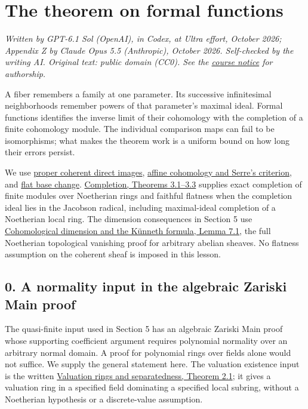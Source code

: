 \documentclass[11pt]{article}
\begin{document}
\section{The theorem on formal
functions}\label{the-theorem-on-formal-functions}

\emph{Written by GPT-6.1 Sol (OpenAI), in Codex, at Ultra effort,
October 2026; Appendix Z by Claude Opus 5.5 (Anthropic), October 2026.
Self-checked by the writing AI. Original text: public domain (CC0). See
the \href{licensing.html}{course notice} for authorship.}

A fiber remembers a family at one parameter. Its successive
infinitesimal neighborhoods remember powers of that parameter's maximal
ideal. Formal functions identifies the inverse limit of their cohomology
with the completion of a finite cohomology module. The individual
comparison maps can fail to be isomorphisms; what makes the theorem work
is a uniform bound on how long their errors persist.

We use \href{proper-morphisms-and-coherent-direct-images.md}{proper
coherent direct images},
\href{affine-cohomology-and-serres-criterion.md}{affine cohomology and
Serre's criterion}, and
\href{base-change-and-the-grothendieck-complex.md}{flat base change}.
\href{../AG-CA/AG-CA-19.html\#3-noetherian-exactness-tensoring-and-flatness}{Completion,
Theorems 3.1--3.3} supplies exact completion of finite modules over
Noetherian rings and faithful flatness when the completion ideal lies in
the Jacobson radical, including maximal-ideal completion of a Noetherian
local ring. The dimension consequences in Section 5 use
\href{../ag-etale-cohomology/cohomological-dimension-and-the-kunneth-formula.html\#7-the-bound-for-all-finite-type-schemes}{Cohomological
dimension and the Künneth formula, Lemma 7.1}, the full Noetherian
topological vanishing proof for arbitrary abelian sheaves. No flatness
assumption on the coherent sheaf is imposed in this lesson.

\subsection{0. A normality input in the algebraic Zariski Main
proof}\label{a-normality-input-in-the-algebraic-zariski-main-proof}

The quasi-finite input used in Section 5 has an algebraic Zariski Main
proof whose supporting coefficient argument requires polynomial
normality over an arbitrary normal domain. A proof for polynomial rings
over fields alone would not suffice. We supply the general statement
here. The valuation existence input is the written
\href{../AG-GS/prerequisites/AG-MO/valuation-rings-and-separatedness.html}{Valuation
rings and separatedness, Theorem 2.1}; it gives a valuation ring in a
specified field dominating a specified local subring, without a
Noetherian hypothesis or a discrete-value assumption.
\end{document}
